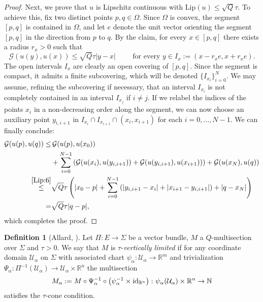 \documentclass[a4paper,11pt,reqno]{amsart}
\theoremstyle{definition}
\newtheorem{definition}[theorem]{Definition}
\numberwithin{equation}{section}
\numberwithin{subsection}{section}
\newcommand{\N}{\mathbb{N}}
\newcommand{\R}{\mathbb{R}}
\newcommand{\U}{\mathcal{U}}
\newcommand{\G}{\mathcal{G}}
\newcommand{\Lip}{\mathrm{Lip}}
\begin{document}
\begin{proof}
Next, we prove that $u$ is Lipschitz continuous with $\Lip(u) \leq \sqrt{Q} \tau$. To achieve this, fix two distinct points $p,q \in \Omega$. Since $\Omega$ is convex, the segment $\left[ p, q \right]$ is contained in $\Omega$, and let $e$ denote the unit vector orienting the segment $\left[ p, q \right]$ in the direction from $p$ to $q$. By the claim, for every $x \in \left[ p, q \right]$ there exists a radius $r_{x} > 0$ such that
\begin{equation} \label{Lip:6}
\G(u(y), u(x)) \leq \sqrt{Q} \tau |y - x| \hspace{1cm} \mbox{for every } y \in I_{x} := \left( x - r_{x} e, x + r_{x} e \right).
\end{equation}
The open intervals $I_{x}$ are clearly an open covering of $\left[ p, q \right]$. Since the segment is compact, it admits a finite subcovering, which will be denoted $\{ I_{x_{i}} \}_{i=0}^{N}$. We may assume, refining the subcovering if necessary, that an interval $I_{x_i}$ is not completely contained in an interval $I_{x_j}$ if $i \neq j$. If we relabel the indices of the points $x_{i}$ in a non-decreasing order along the segment, we can now choose an auxiliary point $y_{i,i+1}$ in $I_{x_i} \cap I_{x_{i+1}} \cap \left( x_{i}, x_{i+1} \right)$ for each $i = 0,\dots,N-1$. We can finally conclude:
\begin{equation} \label{Lip:7}
\begin{split}
\G(u(p), u(q)) \leq & \, \G(u(p), u(x_{0})) \\
& + \sum_{i=0}^{N-1} \left( \G(u(x_{i}), u(y_{i,i+1})) + \G(u(y_{i,i+1}), u(x_{i+1})) \right) + \G(u(x_N), u(q)) \\
\overset{\eqref{Lip:6}}{\leq} & \sqrt{Q} \tau \left( |x_{0} - p| + \sum_{i=0}^{N-1} \left( |y_{i,i+1} - x_{i}| + |x_{i+1} - y_{i,i+1}| \right) + |q - x_{N}| \right) \\
= & \sqrt{Q} \tau |q - p|,
\end{split}
\end{equation} 
which completes the proof.
\end{proof}

\begin{definition}[Allard, {\cite{Allard}}] \label{vert_lim_def} 
Let $\Pi \colon E \to \Sigma$ be a vector bundle, $M$ a $Q$-multisection over $\Sigma$ and $\tau > 0$. We say that $M$ is $\tau$-\emph{vertically limited} if for any coordinate domain $\U_{\alpha}$ on $\Sigma$ with associated chart $\psi_{\alpha} \colon \U_{\alpha} \to \R^m$ and trivialization $\Psi_{\alpha} \colon \Pi^{-1}(\U_{\alpha}) \to \U_{\alpha} \times \R^n$ the multisection
\[
M_{\alpha} := M \circ \Psi_{\alpha}^{-1} \circ \left( \psi_{\alpha}^{-1} \times {\rm id}_{\R^n} \right) \colon \psi_{\alpha}(\U_{\alpha}) \times \R^n \to \N
\]
satisfies the $\tau$-cone condition.
\end{definition}
\end{document}
